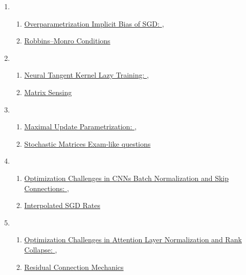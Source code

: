 \documentclass[11pt]{article}
\begin{document}
\begin{enumerate}
	\item  %
	\begin{enumerate}
		\item  \href{https://mp.weixin.qq.com/s/B5CseyR8oEAxleu1VbgpSg}{Overparametrization Implicit Bias of SGD: },\quad \href{https://mp.weixin.qq.com/s/HpHSQo0RcyXXmrOWhIhTAw}{} %
		\item \href{https://mp.weixin.qq.com/s/9aNCck1Q_Hb9axjQHbHnqg}{Robbins–Monro Conditions} %
	\end{enumerate}
	\item  %
	\begin{enumerate}
		\item  \href{https://mp.weixin.qq.com/s/3i5GP_CLLsgs7l5nRm_MmA}{Neural Tangent Kernel Lazy Training: },\quad \href{https://mp.weixin.qq.com/s/OIA87U8jvMjWpD8Byy9aQw}{} %
		\item \href{https://mp.weixin.qq.com/s/fMA5g-zcjDWDdPDX2PjBOg}{Matrix Sensing} %
	\end{enumerate}
	\item  %
	\begin{enumerate}
		\item  \href{https://mp.weixin.qq.com/s/6VHAETbBoHOacsdXOwjZlQ}{Maximal Update Parametrization: },\quad \href{https://mp.weixin.qq.com/s/oyiTWLnI62kU0KIxqDYfiA}{} %
		\item \href{https://mp.weixin.qq.com/s/1KE6_h7KE_soYOxqMd7jJA}{Stochastic Matrices Exam-like questions} %
	\end{enumerate}
	\item  %
	\begin{enumerate}
		\item  \href{https://mp.weixin.qq.com/s/_VPrZPIBw3VHopQkxdAA4w}{Optimization Challenges in CNNs Batch Normalization and Skip Connections: },\quad \href{https://mp.weixin.qq.com/s/4vA8Cah6hbxu-dbdj5nI1g}{} %
		\item \href{https://mp.weixin.qq.com/s/aSQ7-GfrtoUT5ME3BCjq6Q}{Interpolated SGD Rates} %
	\end{enumerate}
	\item  %
	\begin{enumerate}
		\item  \href{https://mp.weixin.qq.com/s/cMvvBYbTHX0X3E23sASbnw}{Optimization Challenges in Attention Layer Normalization and Rank Collapse: },\quad \href{https://mp.weixin.qq.com/s/-Gkk1DshUyTJ96cx9vevoA}{} %
		\item \href{https://mp.weixin.qq.com/s/GTd-kA86muXfernJfDtYAA}{Residual Connection Mechanics} %

\end{enumerate}
\end{enumerate}
\end{document}
